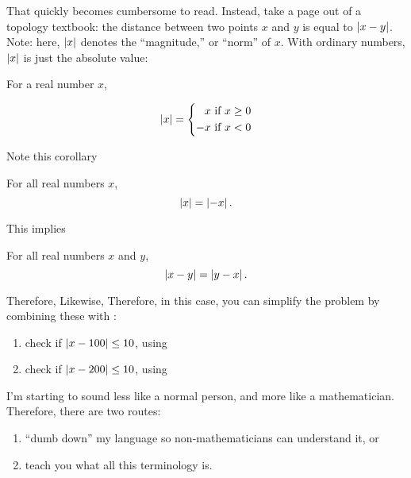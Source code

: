 That quickly becomes cumbersome to read. Instead, take a page out of a
topology textbook: the distance between two points $x$ and $y$ is
equal to $\left|x - y\right|$. Note: here, $\left|x\right|$ denotes the
``magnitude,'' or ``norm'' of $x$. With ordinary numbers, $\left|x\right|$ is
just the absolute value:

\begin{definition}
  For a real number $x$,

  \begin{equation}
    \label{eq:abs-val}
    \left|x\right| = \left\{
      \begin{split}
        x & \text{ if } x \ge 0 \\
        -x & \text{ if } x < 0
      \end{split}
    \right.
  \end{equation}
\end{definition}

Note this corollary

\begin{corollary}
  For all real numbers $x$, $$\left|x\right| = \left|-x\right|.$$
\end{corollary}

This implies

\begin{corollary}
  For all real numbers $x$ and $y$, $$\left|x - y\right| = \left|y - x\right|.$$
\end{corollary}

Therefore,   Likewise,  Therefore, in this case, you can
simplify the problem by combining these with :

\begin{enumerate}
\item check if $\left|x - 100\right| \le 10$, using 
\item check if $\left|x - 200\right| \le 10$, using 
\end{enumerate}

I'm starting to sound less like a normal person, and more like a
mathematician. Therefore, there are two routes:

\begin{enumerate}
\item ``dumb down'' my language so non-mathematicians can understand
  it, or
\item teach you what all this terminology is.
\end{enumerate}

